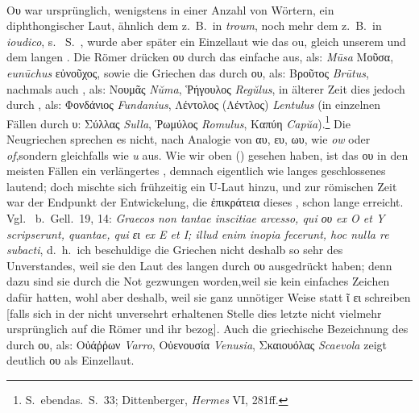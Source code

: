 \paragraph{} Ου war ursprünglich, wenigstens in einer Anzahl von Wörtern, ein diphthongischer
Laut, ähnlich dem   z.~B.\ in \emph{troum}, noch mehr dem
  z.~B.\
in \emph{ioudico}, s.\  S.~\pageref{peiou}, wurde aber später ein Einzellaut wie das
\langlongdecl{franz}{e} ou, gleich unserem und dem  langen
. Die Römer drücken ου durch
das einfache \ipa{u} aus, als: \emph{Mūsa} Μοῦσα, \emph{eunūchus} εὐνοῦχος, sowie die Griechen das
\glsxtrshort{latin} \ipa{ū} durch ου, als: Βροῦτος \emph{Brūtus}, nachmals auch
\ipa{ŭ}, als: Νουμᾶς \emph{Nŭma},
Ῥήγουλος \emph{Regŭlus}, in älterer Zeit dies jedoch durch , als:
Φονδάνιος \emph{Fundanius},
Λέντολος (Λέντλος) \emph{Lentulus} (in einzelnen Fällen  durch υ:
Σύλλας \emph{Sulla},
Ῥωμύλος \emph{Romulus}, Καπύη \emph{Capŭa}).\footnote{%
	S.\ ebendas.\ S.\ 33; Dittenberger, \emph{Hermes} VI, 281ff.
}
Die Neugriechen sprechen es nicht, nach
Analogie von αυ, ευ, ωυ, wie \emph{ow} oder \emph{of},sondern gleichfalls wie
\emph{u} aus.
Wie wir oben () gesehen haben, ist das ου
in den meisten Fällen ein verlängertes \ipa{ο},
demnach eigentlich wie langes geschlossenes  lautend; doch mischte sich
frühzeitig ein U-Laut hinzu, und zur römischen Zeit war der Endpunkt der
Entwickelung, die ἐπικράτεια dieses \ipa{u}, schon lange erreicht.
Vgl.\ \authorlong{NigidiusFigulus} b.\ Gell.\ 19, 14: \emph{Graecos non tantae
	inscitiae arcesso, qui ου ex O et Y scripserunt, quantae, qui ει ex E  et I\@;
	illud enim inopia fecerunt, hoc nulla re subacti}, d.~h.\ ich beschuldige die Griechen nicht deshalb so sehr des
Unverstandes, weil sie den Laut des langen \ipa{u} durch ου ausgedrückt haben; denn
dazu sind sie durch die Not gezwungen worden,weil sie kein einfaches Zeichen
dafür hatten, wohl aber deshalb, weil sie ganz unnötiger Weise statt ῖ ει
schreiben [falls sich in der nicht unversehrt erhaltenen Stelle dies letzte nicht
		vielmehr ursprünglich auf die Römer und ihr \ipa{ei} bezog].
Auch die griechische
Bezeichnung des   durch ου, als: Οὐάῤῥων \emph{Varro},
Οὐενουσία \emph{Venusia},
Σκαιουόλας \emph{Scaevola} zeigt deutlich ου als Einzellaut.

